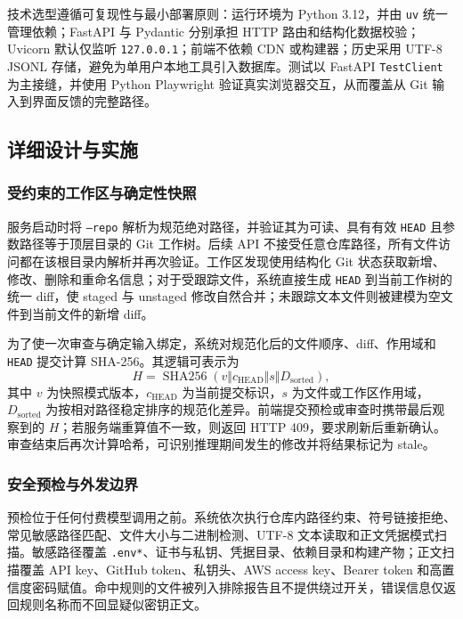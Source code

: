 \documentclass{experimentreport}
\begin{document}
{技术选型遵循可复现性与最小部署原则：运行环境为 Python 3.12，并由 \texttt{uv} 统一管理依赖；FastAPI 与 Pydantic 分别承担 HTTP 路由和结构化数据校验；Uvicorn 默认仅监听 \texttt{127.0.0.1}；前端不依赖 CDN 或构建器；历史采用 UTF-8 JSONL 存储，避免为单用户本地工具引入数据库。测试以 FastAPI \texttt{TestClient} 为主接缝，并使用 Python Playwright 验证真实浏览器交互，从而覆盖从 Git 输入到界面反馈的完整路径。

\subsection{详细设计与实施}

\subsubsection{受约束的工作区与确定性快照}

服务启动时将 \texttt{--repo} 解析为规范绝对路径，并验证其为可读、具有有效 \texttt{HEAD} 且参数路径等于顶层目录的 Git 工作树。后续 API 不接受任意仓库路径，所有文件访问都在该根目录内解析并再次验证。工作区发现使用结构化 Git 状态获取新增、修改、删除和重命名信息；对于受跟踪文件，系统直接生成 \texttt{HEAD} 到当前工作树的统一 diff，使 staged 与 unstaged 修改自然合并；未跟踪文本文件则被建模为空文件到当前文件的新增 diff。

为了使一次审查与确定输入绑定，系统对规范化后的文件顺序、diff、作用域和 \texttt{HEAD} 提交计算 SHA-256。其逻辑可表示为
\[
H = \operatorname{SHA256}(v \Vert c_{\mathrm{HEAD}} \Vert s \Vert D_{\mathrm{sorted}}),
\]
其中 $v$ 为快照模式版本，$c_{\mathrm{HEAD}}$ 为当前提交标识，$s$ 为文件或工作区作用域，$D_{\mathrm{sorted}}$ 为按相对路径稳定排序的规范化差异。前端提交预检或审查时携带最后观察到的 $H$；若服务端重算值不一致，则返回 HTTP 409，要求刷新后重新确认。审查结束后再次计算哈希，可识别推理期间发生的修改并将结果标记为 stale。

\subsubsection{安全预检与外发边界}

预检位于任何付费模型调用之前。系统依次执行仓库内路径约束、符号链接拒绝、常见敏感路径匹配、文件大小与二进制检测、UTF-8 文本读取和正文凭据模式扫描。敏感路径覆盖 \texttt{.env*}、证书与私钥、凭据目录、依赖目录和构建产物；正文扫描覆盖 API key、GitHub token、私钥头、AWS access key、Bearer token 和高置信度密码赋值。命中规则的文件被列入排除报告且不提供绕过开关，错误信息仅返回规则名称而不回显疑似密钥正文。

}
\end{document}
